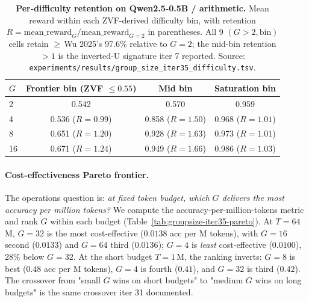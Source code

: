 \begin{table}[htbp]
\centering
\small
\begin{tabular}{lccc}
\toprule
$G$ & Frontier bin (ZVF $\le 0.55$) & Mid bin & Saturation bin \\
\midrule
2  & 0.542 & 0.570 & 0.959 \\
4  & 0.536 ($R{=}0.99$)  & 0.858 ($R{=}1.50$) & 0.968 ($R{=}1.01$) \\
8  & 0.651 ($R{=}1.20$)  & 0.928 ($R{=}1.63$) & 0.973 ($R{=}1.01$) \\
16 & 0.671 ($R{=}1.24$)  & 0.949 ($R{=}1.66$) & 0.986 ($R{=}1.03$) \\
\bottomrule
\end{tabular}
\caption{\textbf{Per-difficulty retention on Qwen2.5-0.5B / arithmetic.}
Mean reward within each ZVF-derived difficulty bin, with retention
$R = \mathrm{mean\_reward}_G / \mathrm{mean\_reward}_{G{=}2}$ in
parentheses.  All 9 $(G{>}2, \mathrm{bin})$ cells retain $\ge$\,Wu
2025's 97.6\% relative to $G{=}2$; the mid-bin retention $>1$ is
the inverted-U signature iter 7 reported.  Source:
\texttt{experiments/results/group\_size\_iter35\_difficulty.tsv}.}
\label{tab:groupsize-iter35-diff}
\end{table}

\paragraph{Cost-effectiveness Pareto frontier.}
The operations question is: \emph{at fixed token budget, which $G$
delivers the most accuracy per million tokens?} We compute the
accuracy-per-million-tokens metric and rank $G$ within each budget
(Table~\ref{tab:groupsize-iter35-pareto}). At $T{=}64$\,M, $G{=}32$
is the most cost-effective ($0.0138$ acc per M tokens), with
$G{=}16$ second ($0.0133$) and $G{=}64$ third ($0.0136$); $G{=}4$
is \emph{least} cost-effective ($0.0100$), 28\% below $G{=}32$.
At the short budget $T{=}1$\,M, the ranking inverts: $G{=}8$ is best
($0.48$ acc per M tokens), $G{=}4$ is fourth ($0.41$), and
$G{=}32$ is third ($0.42$). The crossover from "small $G$ wins on
short budgets" to "medium $G$ wins on long budgets" is the same
crossover iter 31 documented.

